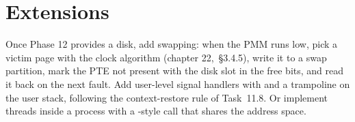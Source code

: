 \documentclass[11pt,a4paper]{article}
\begin{document}
\section{Extensions}

Once Phase 12 provides a disk, add swapping: when the PMM runs low, pick a victim page with the clock algorithm
(\OSTEP chapter 22, \MOS\,\S3.4.5), write it to a swap partition, mark the PTE not present with the disk slot in the
free bits, and read it back on the next fault. Add user-level signal handlers with  and a
 trampoline on the user stack, following the context-restore rule of Task~11.8. Or implement threads inside a process with a -style call
that shares the address space.

\booklegend
\end{document}
